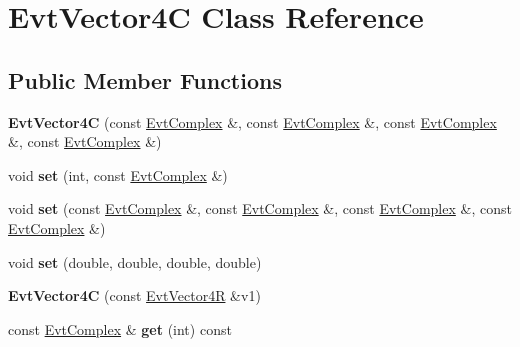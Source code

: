 \hypertarget{class_evt_vector4_c}{}\section{Evt\+Vector4\+C Class Reference}
\label{class_evt_vector4_c}
\subsection*{Public Member Functions}
\begin{DoxyCompactItemize}
\item 
\hypertarget{class_evt_vector4_c_abd466d3c37626ed46287d7dfb33e116f}{}{\bfseries Evt\+Vector4\+C} (const \hyperlink{class_evt_complex}{Evt\+Complex} \&, const \hyperlink{class_evt_complex}{Evt\+Complex} \&, const \hyperlink{class_evt_complex}{Evt\+Complex} \&, const \hyperlink{class_evt_complex}{Evt\+Complex} \&)\label{class_evt_vector4_c_abd466d3c37626ed46287d7dfb33e116f}

\item 
\hypertarget{class_evt_vector4_c_a3cac7dfe66e7d4ca0356d731b6f02ced}{}void {\bfseries set} (int, const \hyperlink{class_evt_complex}{Evt\+Complex} \&)\label{class_evt_vector4_c_a3cac7dfe66e7d4ca0356d731b6f02ced}

\item 
\hypertarget{class_evt_vector4_c_ae2f8a97ba58c6b91ca7fb51d2c36f5e2}{}void {\bfseries set} (const \hyperlink{class_evt_complex}{Evt\+Complex} \&, const \hyperlink{class_evt_complex}{Evt\+Complex} \&, const \hyperlink{class_evt_complex}{Evt\+Complex} \&, const \hyperlink{class_evt_complex}{Evt\+Complex} \&)\label{class_evt_vector4_c_ae2f8a97ba58c6b91ca7fb51d2c36f5e2}

\item 
\hypertarget{class_evt_vector4_c_aaf0b9e1f05e36017a75df09dfbd650fb}{}void {\bfseries set} (double, double, double, double)\label{class_evt_vector4_c_aaf0b9e1f05e36017a75df09dfbd650fb}

\item 
\hypertarget{class_evt_vector4_c_a855c3579ada81873abffa008060635c6}{}{\bfseries Evt\+Vector4\+C} (const \hyperlink{class_evt_vector4_r}{Evt\+Vector4\+R} \&v1)\label{class_evt_vector4_c_a855c3579ada81873abffa008060635c6}

\item 
\hypertarget{class_evt_vector4_c_a8e01f4b76608cdbc4ad162e35ca8eee2}{}const \hyperlink{class_evt_complex}{Evt\+Complex} \& {\bfseries get} (int) const \label{class_evt_vector4_c_a8e01f4b76608cdbc4ad162e35ca8eee2}


\end{DoxyCompactItemize}
